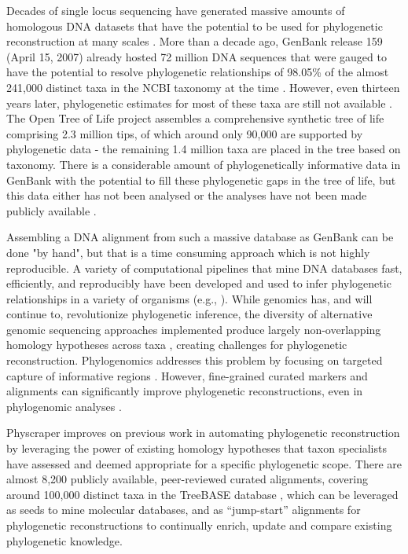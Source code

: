 \documentclass{bmcart}
\begin{document}
Decades of single locus sequencing have generated
massive amounts of homologous DNA datasets that have the potential to be used for phylogenetic
reconstruction at many scales \cite{sanderson2008phylota}.
More than a decade ago, GenBank release 159 (April 15, 2007) already hosted 72
million DNA sequences that were gauged to have the potential to resolve phylogenetic
relationships of 98.05\% of the almost 241,000
distinct taxa in the NCBI taxonomy at the time \cite{sanderson2008phylota}.
However, even thirteen years later, phylogenetic estimates for most of these taxa
are still not available \cite{mctavish_how_2017}.
The Open Tree of Life project assembles a comprehensive synthetic tree of life comprising
2.3 million tips, of which around only
90,000 are supported by phylogenetic data - the remaining 1.4 million taxa are placed
in the tree based on taxonomy.
There is a considerable amount of phylogenetically
informative data in GenBank with the potential to fill these phylogenetic gaps in
the tree of life, but this data either has not been analysed or the analyses
have not been made publicly available \cite{mctavish_how_2017}.

Assembling a DNA alignment from such a massive database as GenBank can be done "by hand",
but that is a time consuming approach which is not highly reproducible.
A variety of computational pipelines that mine DNA databases fast, efficiently, and reproducibly
have been developed and used to infer phylogenetic relationships in a variety of organisms
(e.g., \cite{smith2009mega, antonelli2017toward, izquierdo2014pumper, pearse2013phylogenerator}).
While genomics has, and will continue to, revolutionize phylogenetic inference,
the diversity of alternative genomic sequencing approaches implemented produce
largely non-overlapping homology hypotheses across taxa \cite{jones2016targeted},
creating challenges for phylogenetic reconstruction.
Phylogenomics addresses this problem by focusing on targeted capture of informative
regions \cite{andermann2020guide}.
However, fine-grained curated markers and alignments can significantly improve phylogenetic
reconstructions, even in phylogenomic analyses \cite{fragoso2017pilot}.

Physcraper improves on previous work in automating phylogenetic reconstruction by leveraging
the power of existing homology hypotheses that taxon specialists have assessed
and deemed appropriate for a specific phylogenetic scope.
There are almost 8,200 publicly available, peer-reviewed curated alignments, covering
around 100,000 distinct taxa in the TreeBASE database \cite{piel2009treebase}, which
can be leveraged as seeds to mine molecular databases, and as ``jump-start'' alignments
for phylogenetic reconstructions \cite{morrison2006multiple} to continually enrich,
update and compare existing phylogenetic knowledge.
\end{document}
